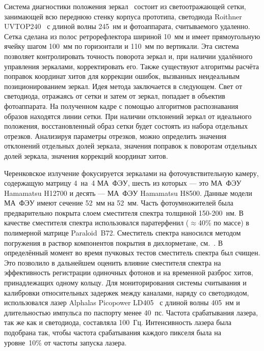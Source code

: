 Система диагностики положения зеркал~\cite{JORDANPR14} состоит из светоотражающей сетки, занимающей всю переднюю стенку корпуса прототипа, светодиода Roithner UVTOP240~\cite{LED} с длиной волны 245~нм и фотоаппарата, считываемого удаленно. Сетка сделана из полос ретрорефлектора шириной 10~мм и имеет прямоугольную ячейку шагом 100~мм по горизонтали и 110~мм по вертикали. Эта система позволяет контролировать точность поворота зеркал и, при наличии удалённого управления зеркалами, корректировать его. Также существуют алгоритмы расчёта поправок координат хитов для коррекции ошибок, вызванных неидеальным позиционированием зеркал. Идея метода заключается в следующем. Свет от светодиода, отражаясь от сетки и затем от зеркал, попадает в объектив фотоаппарата. На полученном кадре с помощью алгоритмов распознавания образов находятся линии сетки.
При наличии отклонений зеркал от идеального положения, восстановленный образ сетки будет состоять из набора отдельных отрезков.
Анализируя параметры отрезков, можно определить значения отклонений отдельных долей зеркала, значения поправок к поворотам отдельных долей зеркала, значения коррекций координат хитов.

Черенковское излучение фокусируется зеркалами на фоточувствительную камеру, содержащую матрицу 4~на~4 МА~ФЭУ, шесть из которых --- это МА~ФЭУ Hamamatsu H12700 и десять --- МА~ФЭУ Hamamatsu H8500. Данные модели МА~ФЭУ имеют сечение 52~мм на 52~мм. Часть фотоумножителей была предварительно покрыта слоем сместителя спектра толщиной 150-200~нм. В качестве сместителя спектра использовался паратерфенил ($ \approx $40\% по массе) в полимерной матрице Paraloid~B72. Сместитель спектра наносился методом погружения в раствор компонентов покрытия в дихлорметане, см.~\cite{WLSINFLUENCE}. В определённый момент во время пучковых тестов сместитель спектра был счищен. Это позволило в дальнейшем оценить влияние сместителя спектра на эффективность регистрации одиночных фотонов и на временной разброс хитов, принадлежащих одному кольцу. Для мониторирования системы считывания и калибровки относительных задержек между каналами, наряду со светодиодом, использовался лазер Alphalas Picopower LD405~\cite{ALPHALAS} с длиной волны 405~нм и длительностью импульса по паспорту менее 40~пс. Частота срабатывания лазера, так же как и светодиода, составляла 100~Гц. Интенсивность лазера была подобрана так, чтобы частота срабатывания каждого пикселя была на уровне~10\% от частоты запуска лазера.


